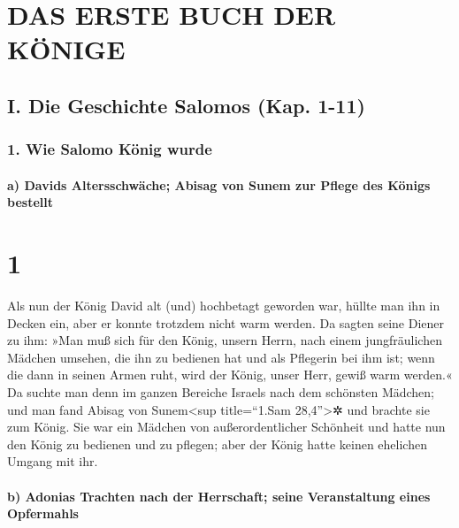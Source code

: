 \hypertarget{das-erste-buch-der-kuxf6nige}{%
\section{DAS ERSTE BUCH DER KÖNIGE}\label{das-erste-buch-der-kuxf6nige}}

\hypertarget{i.-die-geschichte-salomos-kap.-1-11}{%
\subsection{I. Die Geschichte Salomos (Kap.
1-11)}\label{i.-die-geschichte-salomos-kap.-1-11}}

\hypertarget{wie-salomo-kuxf6nig-wurde}{%
\subsubsection{1. Wie Salomo König
wurde}\label{wie-salomo-kuxf6nig-wurde}}

\hypertarget{a-davids-altersschwuxe4che-abisag-von-sunem-zur-pflege-des-kuxf6nigs-bestellt}{%
\paragraph{a) Davids Altersschwäche; Abisag von Sunem zur Pflege des
Königs
bestellt}\label{a-davids-altersschwuxe4che-abisag-von-sunem-zur-pflege-des-kuxf6nigs-bestellt}}

\hypertarget{section}{%
\section{1}\label{section}}

Als nun der König David alt (und) hochbetagt geworden war,
hüllte man ihn in Decken ein, aber er konnte trotzdem nicht warm werden.
Da sagten seine Diener zu ihm: »Man muß sich für den
König, unsern Herrn, nach einem jungfräulichen Mädchen umsehen, die ihn
zu bedienen hat und als Pflegerin bei ihm ist; wenn die dann in seinen
Armen ruht, wird der König, unser Herr, gewiß warm werden.«
Da suchte man denn im ganzen Bereiche Israels nach dem
schönsten Mädchen; und man fand Abisag von Sunem\textless sup
title=``1.Sam 28,4''\textgreater✲ und brachte sie zum König.
Sie war ein Mädchen von außerordentlicher Schönheit und
hatte nun den König zu bedienen und zu pflegen; aber der König hatte
keinen ehelichen Umgang mit ihr.

\hypertarget{b-adonias-trachten-nach-der-herrschaft-seine-veranstaltung-eines-opfermahls}{%
\paragraph{b) Adonias Trachten nach der Herrschaft; seine Veranstaltung
eines
Opfermahls}\label{b-adonias-trachten-nach-der-herrschaft-seine-veranstaltung-eines-opfermahls}}

